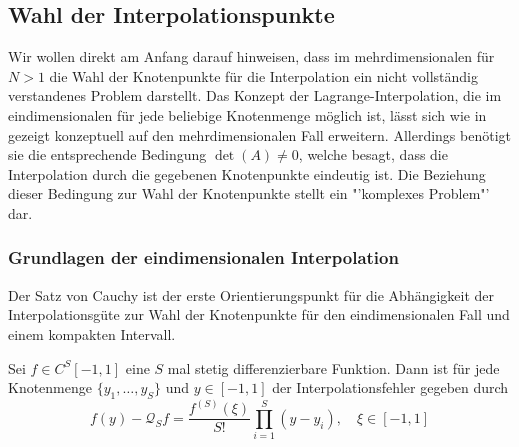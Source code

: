 \subsection{Wahl der Interpolationspunkte}
Wir wollen direkt am Anfang darauf hinweisen, dass im mehrdimensionalen für $N>1$ die Wahl der Knotenpunkte für die Interpolation ein nicht vollständig verstandenes Problem darstellt. Das Konzept der Lagrange-Interpolation, die im eindimensionalen für jede beliebige Knotenmenge möglich ist, lässt sich wie in \autocite{San07} gezeigt konzeptuell auf den mehrdimensionalen Fall erweitern. Allerdings benötigt sie die entsprechende Bedingung $\det(A)\neq 0$, welche besagt, dass die Interpolation durch die gegebenen Knotenpunkte eindeutig ist. Die Beziehung dieser Bedingung zur Wahl der Knotenpunkte stellt ein "'komplexes Problem"' dar.
\subsubsection*{Grundlagen der eindimensionalen Interpolation}
Der Satz von Cauchy ist der erste Orientierungspunkt für die Abhängigkeit der Interpolationsgüte zur Wahl der Knotenpunkte für den eindimensionalen Fall und einem kompakten Intervall.
\begin{maththeorem}[Cauchy]
Sei $f\in C^{S}[-1,1]$ eine $S$ mal stetig differenzierbare Funktion. Dann ist für jede Knotenmenge $\lbrace y_1,\dots,y_{S}\rbrace$ und $y\in[-1,1]$ der Interpolationsfehler gegeben durch
\[f(y)-\mathcal{Q}_{S}f=\frac{f^{(S)}(\xi)}{S!}\prod_{i=1}^{S}(y-y_i),\quad \xi\in [-1,1]\]
\end{maththeorem}

